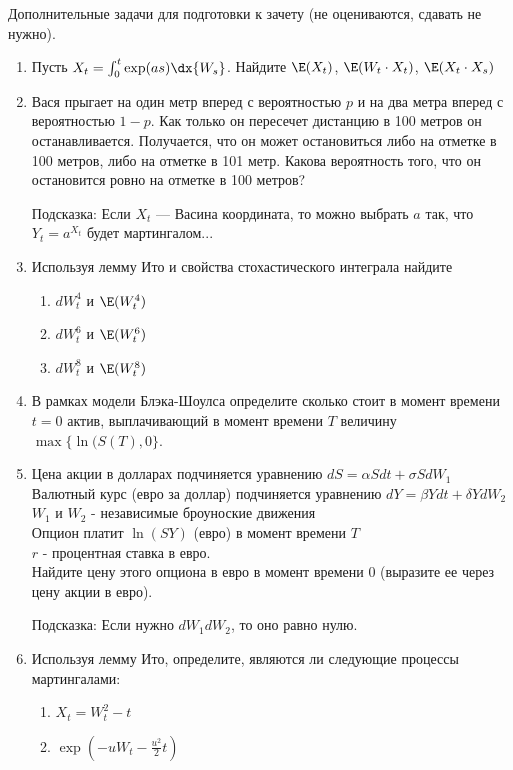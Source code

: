 \documentclass[pdftex,12pt,a4paper]{article}
\begin{document}
Дополнительные задачи для подготовки к зачету (не оцениваются, сдавать не нужно).
\begin{enumerate}
\item Пусть $X_t=\int_0^t \exp(as)\dx{W_s}$. Найдите $\E(X_t)$, $\E(W_t\cdot X_t)$, $\E(X_t\cdot X_s)$

\item Вася прыгает на один метр вперед с вероятностью $p$ и на два метра вперед с вероятностью $1-p$. Как только он пересечет дистанцию в 100 метров он останавливается. Получается, что он может остановиться либо на отметке в 100 метров, либо на отметке в 101 метр. Какова вероятность того, что он остановится ровно на отметке в 100 метров?

Подсказка: Если $X_t$ --- Васина координата, то можно выбрать $a$ так, что $Y_t=a^{X_t}$ будет мартингалом...

\item Используя лемму Ито и свойства стохастического интеграла найдите 
\begin{enumerate}
\item $dW^4_t$ и $\E(W^4_t)$
\item $dW^6_t$ и $\E(W^6_t)$
\item $dW^8_t$ и $\E(W^8_t)$
\end{enumerate}

\item В рамках модели Блэка-Шоулса определите сколько стоит в момент времени $t=0$ актив, выплачивающий в момент времени $T$ величину $\max\{\ln(S(T),0\}$.

\item Цена акции в долларах подчиняется уравнению $dS=\alpha Sdt+\sigma SdW_{1}$ \\
Валютный курс (евро за доллар) подчиняется уравнению $dY=\beta Ydt+\delta YdW_{2}$ \\
$W_{1}$ и $W_{2}$ - независимые броуноские движения \\
Опцион платит $\ln(SY)$ (евро) в момент времени $T$ \\
$r$ - процентная ставка в евро. \\
Найдите цену этого опциона в евро в момент времени $0$ (выразите ее через цену акции в евро). 

Подсказка: Если нужно $dW_1 dW_2$, то оно равно нулю.

\item Используя лемму Ито, определите, являются ли следующие процессы мартингалами:
\begin{enumerate}
\item $X_{t}=W_{t}^{2}-t$ 
\item $\exp(-uW_{t}-\frac{u^{2}}{2}t)$ 
\end{enumerate}


\end{enumerate}
\end{document}
